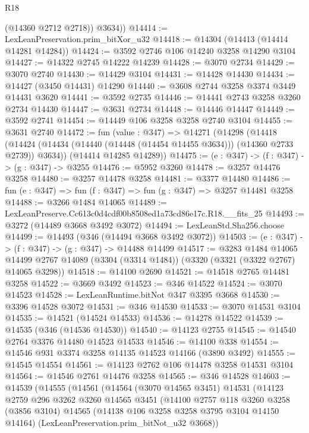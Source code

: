 \begin{lexlean}{R18}
\begin{coremodule}
          (@14360 @2712 @2718))
        @3634))
@14414 := LexLeanPreservation.prim_bitXor_u32
@14418 := @14304 (@14413 (@14414 @14281 @14284))
@14424 := @3592 @2746 @106 @14240 @3258 @14290 @3104
@14427 := @14322 @2745 @14222 @14239
@14428 := @3070 @2734
@14429 := @3070 @2740
@14430 := @14429 @3104
@14431 := @14428 @14430
@14434 := @14427 (@3450 @14431) @14290
@14440 := @3608 @2744 @3258 @3374 @3449 @14431 @3620
@14441 := @3592 @2735
@14446 := @14441 @2743 @3258 @3260 @2734 @14430
@14447 := @3631 @2734
@14448 := @14446 @14447
@14449 := @3592 @2741
@14454 := @14449 @106 @3258 @3258 @2740 @3104
@14455 := @3631 @2740
@14472 := fun (value : @347) =>
  @14271
    (@14298
      (@14418 (@14424 (@14434 (@14440 (@14448 (@14454 @14455 @3634))) (@14360 @2733 @2739)) @3634))
      (@14414 @14285 @14289))
@14475 := (e : @347) -> (f : @347) -> (g : @347) -> @3255
@14476 := @5952 @3260
@14478 := @3257 @14476 @3258
@14480 := @3257 @14478 @3258
@14481 := @3377 @14480
@14486 := fun (e : @347) => fun (f : @347) => fun (g : @347) => @3257 @14481 @3258
@14488 := @3266 @1484 @14065
@14489 := LexLeanPreserve.Cc613c0d4cdf00b8508ed1a73cd86e17c.R18.__fits_25
@14493 := @3272 (@14489 @3668 @3492 @3072)
@14494 := LexLeanStd.Sha256.choose
@14499 := @14493 (@346 (@14494 @3668 @3492 @3072))
@14503 := (e : @347) -> (f : @347) -> (g : @347) -> @14488 @14499
@14517 := @3283
    @1484
    @14065
    @14499
    @2767
    @14089
    (@3304 (@3314 @1484))
    (@3320 (@3321 (@3322 @2767) @14065 @3298))
@14518 := @14100 @2690
@14521 := @14518 @2765 @14481 @3258
@14522 := @3669 @3492
@14523 := @346 @14522
@14524 := @3070 @14523
@14528 := LexLeanRuntime.bitNot @347 @3395 @3668
@14530 := @3396 @14528 @3072
@14531 := @346 @14530
@14533 := @3070 @14531 @3104
@14535 := @14521 (@14524 @14533)
@14536 := @14278 @14522
@14539 := @14535 (@346 (@14536 @14530))
@14540 := @14123 @2755
@14545 := @14540 @2764 @3376 @14480 @14523 @14533
@14546 := @14100 @338
@14554 := @14546 @931 @3374 @3258 @14135 @14523 @14166 (@3890 @3492)
@14555 := @14545 @14554
@14561 := @14123 @2762 @106 @14478 @3258 @14531 @3104
@14564 := @14546 @2761 @14476 @3258
@14565 := @346 @14528
@14603 := @14539
    (@14555
      (@14561
        (@14564
          (@3070 @14565 @3451)
          @14531
          (@14123
            @2759
            @296
            @3262
            @3260
            @14565
            @3451
            (@14100
              @2757
              @118
              @3260
              @3258
              (@3856 @3104)
              @14565
              (@14138 @106 @3258 @3258 @3795 @3104 @14150 @14164)
              (LexLeanPreservation.prim_bitNot_u32 @3668))

\end{coremodule}
\end{lexlean}
